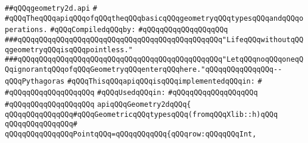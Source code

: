 \label{src/lib/std/2d/geometry2d.api}
\verb|##qQQqgeometry2d.api|\newline
\verb|#|\newline
\verb|#qQQqTheqQQqapiqQQqofqQQqtheqQQqbasicqQQqgeometryqQQqtypesqQQqandqQQqoperations.|\newline
\newline
\verb|#qQQqCompiledqQQqby:|\newline
\verb|#qQQqqQQqqQQqqQQqqQQq|\newline
\newline
\newline
\verb|###qQQqqQQqqQQqqQQqqQQqqQQqqQQqqQQqqQQqqQQqqQQqqQQq"LifeqQQqwithoutqQQqgeometryqQQqisqQQqpointless."|\newline
\newline
\verb|###qQQqqQQqqQQqqQQqqQQqqQQqqQQqqQQqqQQqqQQqqQQqqQQq"LetqQQqnoqQQqoneqQQqignorantqQQqofqQQqGeometryqQQqenterqQQqhere."qQQqqQQqqQQqqQQq--qQQqPythagoras|\newline
\newline
\newline
\newline
\newline
\newline
\verb|#qQQqThisqQQqapiqQQqisqQQqimplementedqQQqin:|\newline
\verb|#|\newline
\verb|#qQQqqQQqqQQqqQQqqQQq|\newline
\newline
\verb|#qQQqUsedqQQqin:|\newline
\verb|#qQQqqQQqqQQqqQQqqQQq|\newline
\verb|#qQQqqQQqqQQqqQQqqQQq|\newline
\newline
\newline
\verb|apiqQQqGeometry2dqQQq{|\newline
\newline
\newline
\verb|qQQqqQQqqQQqqQQq#qQQqGeometricqQQqtypesqQQq(fromqQQqXlib::h)qQQq|\newline
\verb|qQQqqQQqqQQqqQQq#|\newline
\verb|qQQqqQQqqQQqqQQqPointqQQq=qQQqqQQqqQQq{qQQqrow:qQQqqQQqInt,|\newline
